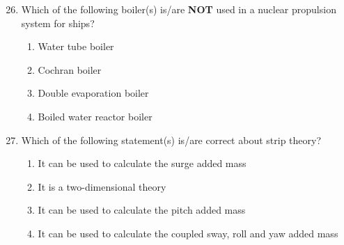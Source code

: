 \documentclass[journal]{IEEEtran}
\theoremstyle{remark}
\begin{document}
\begin{enumerate}[itemsep=1em]
\setcounter{enumi}{25}
\item Which of the following boiler(s) is/are \textbf{NOT} used in a nuclear propulsion system for ships?
\begin{enumerate}[leftmargin=2.5em, labelsep=0.5em, itemsep=0.5em]
       \item Water tube boiler
       \item Cochran boiler
       \item Double evaporation boiler
       \item Boiled water reactor boiler
\end{enumerate}

\end{enumerate}

\begin{enumerate}[itemsep=1em]
\setcounter{enumi}{26}
\item Which of the following statement(s) is/are correct about strip theory?

\begin{enumerate}[leftmargin=2.5em, labelsep=0.5em, itemsep=0.5em]
       \item It can be used to calculate the surge added mass 
       \item It is a two-dimensional theory 
       \item It can be used to calculate the pitch added mass 
       \item It can be used to calculate the coupled sway, roll and yaw added mass 
\end{enumerate}
\end{enumerate}

\newpage
\vspace*{0.25cm}
\end{document}

